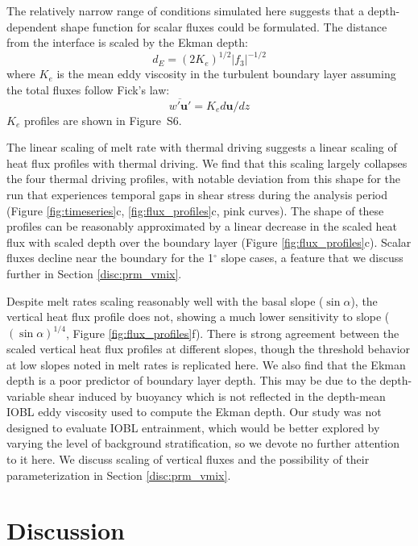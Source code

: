 \documentclass[draft]{styles/agujournal2019}
\begin{document}
The relatively narrow range of conditions simulated here suggests that a depth-dependent shape function for scalar fluxes could be formulated. The distance from the interface is scaled by the Ekman depth:
\begin{equation}
    d_E = (2 K_e)^{1/2} |f_3|^{-1/2}
\end{equation}
where $K_e$ is the mean eddy viscosity in the turbulent boundary layer assuming the total fluxes follow Fick's law:
\begin{equation}
    \overline{w'\mathbf{u}'} = K_e d\mathbf{u}/dz
\end{equation}
$K_e$ profiles are shown in Figure~S6. 

The linear scaling of melt rate with thermal driving suggests a linear scaling of heat flux profiles with thermal driving. We find that this scaling largely collapses the four thermal driving profiles, with notable deviation from this shape for the run that experiences temporal gaps in shear stress during the analysis period (Figure \ref{fig:timeseries}c, \ref{fig:flux_profiles}c,  pink curves). The shape of these profiles can be reasonably approximated by a linear decrease in the scaled heat flux with scaled depth over the boundary layer (Figure \ref{fig:flux_profiles}c). Scalar fluxes decline near the boundary for the 1$^{\circ}$ slope cases, a feature that we discuss further in Section \ref{disc:prm_vmix}. 

Despite melt rates scaling reasonably well with the basal slope ($\sin \alpha$), the vertical heat flux profile does not, showing a much lower sensitivity to slope ($(\sin\alpha)^{1/4}$, Figure \ref{fig:flux_profiles}f). There is strong agreement between the scaled vertical heat flux profiles at different slopes, though the threshold behavior at low slopes noted in melt rates is replicated here. We also find that the Ekman depth is a poor predictor of boundary layer depth. This may be due to the depth-variable shear induced by buoyancy which is not reflected in the depth-mean IOBL eddy viscosity used to compute the Ekman depth. Our study was not designed to evaluate IOBL entrainment, which would be better explored by varying the level of background stratification, so we devote no further attention to it here. We discuss scaling of vertical fluxes and the possibility of their parameterization in Section \ref{disc:prm_vmix}.


\section{Discussion}\label{disc}
\end{document}
